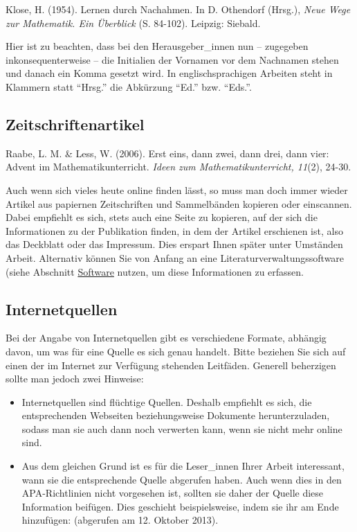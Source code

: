 \documentclass[ngerman,oneside,12pt,a4paper]{scrbook}
\begin{document}
Klose, H. (1954). Lernen durch Nachahmen. In D.
Othendorf (Hrsg.), \emph{Neue Wege zur Mathematik. Ein Überblick} (S.
84-102). Leipzig: Siebald.

Hier ist zu beachten, dass bei den Herausgeber\_innen nun -- zugegeben
inkonsequenterweise -- die Initialien der Vornamen vor dem Nachnamen
stehen und danach ein Komma gesetzt wird. In englischsprachigen Arbeiten
steht in Klammern statt \enquote{Hrsg.} die Abkürzung \enquote{Ed.} bzw.
\enquote{Eds.}.

\subsection*{Zeitschriftenartikel}\label{zeitschriftenartikel}

Raabe, L. M. \& Less, W. (2006). Erst eins, dann
zwei, dann drei, dann vier: Advent im Mathematikunterricht. \emph{Ideen
zum Mathematikunterricht, 11}(2), 24-30.

Auch wenn sich vieles heute online finden lässt, so muss man doch immer
wieder Artikel aus papiernen Zeitschriften und Sammelbänden kopieren
oder einscannen. Dabei empfiehlt es sich, stets auch eine Seite zu
kopieren, auf der sich die Informationen zu der Publikation finden, in
dem der Artikel erschienen ist, also das Deckblatt oder das Impressum.
Dies erspart Ihnen später unter Umständen Arbeit. Alternativ können Sie
von Anfang an eine Literaturverwaltungssoftware (siehe Abschnitt
\protect\hyperlink{sec:software}{Software} nutzen, um diese
Informationen zu erfassen.

\subsection*{Internetquellen}\label{internetquellen}

Bei der Angabe von Internetquellen gibt es verschiedene Formate,
abhängig davon, um was für eine Quelle es sich genau handelt. Bitte
beziehen Sie sich auf einen der im Internet zur Verfügung stehenden
Leitfäden. Generell beherzigen sollte man jedoch zwei Hinweise:

\begin{itemize}
\item
  Internetquellen sind flüchtige Quellen. Deshalb empfiehlt es sich, die
  entsprechenden Webseiten beziehungsweise Dokumente herunterzuladen,
  sodass man sie auch dann noch verwerten kann, wenn sie nicht mehr
  online sind.
\item
  Aus dem gleichen Grund ist es für die Leser\_innen Ihrer Arbeit
  interessant, wann sie die entsprechende Quelle abgerufen haben. Auch
  wenn dies in den APA-Richtlinien nicht vorgesehen ist, sollten sie
  daher der Quelle diese Information beifügen. Dies geschieht
  beispielsweise, indem sie ihr am Ende hinzufügen: (abgerufen am 12.
  Oktober 2013).
\end{itemize}
\end{document}
